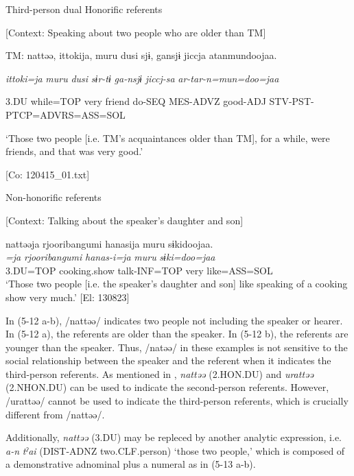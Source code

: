 \ea \label{ex:5:12}   Third-person dual
  \ea Honorific referents

  [Context: Speaking about two people who are older than TM]

  TM:  nattəə,  {\textbar}ittoki{\textbar}ja,  muru  dusi  sjɨ,  gansjɨ  jiccja atanmundoojaa.
                                                                                                                            
    \textit{}  \textit{ittoki=ja}  \textit{muru}  \textit{dusi}  \textit{sɨr-tɨ}  \textit{ga-nsjɨ}  \textit{jiccj-sa} \textit{ar-tar-n=mun=doo=jaa}
                                                                                                                            
    3.DU  while=TOP  very  friend  do-SEQ  MES-ADVZ  good-ADJ  STV-PST-PTCP=ADVRS=ASS=SOL
    
    ‘Those two people [i.e. TM’s acquaintances older than TM], for a while, were friends, and that was very good.’

    [Co: 120415\_01.txt]

  \ex Non-honorific referents

  [Context: Talking about the speaker’s daughter and son]

\glll  nattəəja  {\textbar}rjooribangumi{\textbar}  hanasija  muru  sɨkidoojaa.\\
\textit{=ja}  \textit{rjooribangumi}  \textit{hanas-i=ja}  \textit{muru}  \textit{sɨki=doo=jaa}\\
3.DU=TOP  cooking.show  talk-INF=TOP  very  like=ASS=SOL\\
\glt ‘Those two people [i.e. the speaker’s daughter and son] like speaking of a cooking show very much.’ [El: 130823]
\z
\z

In (5-12 a-b), /nattəə/ indicates two people not including the speaker or hearer. In (5-12 a), the referents are older than the speaker. In (5-12 b), the referents are younger than the speaker. Thus, /natəə/ in these examples is not sensitive to the social relationship between the speaker and the referent when it indicates the third-person referents. As mentioned in , \textit{nattəə} (2.HON.DU) and \textit{urattəə} (2.NHON.DU) can be used to indicate the second-person referents. However, /urattəə/ cannot be used to indicate the third-person referents, which is crucially different from /nattəə/.

Additionally, \textit{nattəə} (3.DU) may be repleced by another analytic expression, i.e. \textit{a-n} \textit{tˀai} (DIST-ADNZ two.CLF.person) ‘those two people,’ which is composed of a demonstrative adnominal plus a numeral as in (5-13 a-b).

